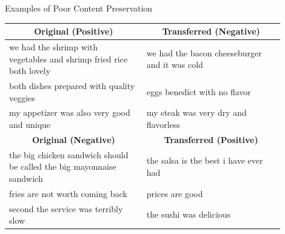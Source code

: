 \documentclass[aspectratio=169]{beamer}
\newcommand{\tabh}[1]{\multicolumn{1}{c|}{\textbf{#1}}}
\newcommand{\tabc}[2]{\multicolumn{1}{|c||}{\multirow{#1}{*}{\textbf{#2}}}}
\begin{document}
% 

\begin{frame}{Examples of Poor Content Preservation}

	\begin{table}[ht]
		\centering
		\begin{tabular}{| p{0.45\linewidth} || p{0.45\linewidth} |}
			\hline
			\tabc{1}{Original (Positive)}                                         & \tabh{Transferred (Negative)}                 \\
			\hline
			\hline
			we had the shrimp with vegetables and shrimp fried rice both lovely   & we had the bacon cheeseburger and it was cold \\
			\hline
			both dishes prepared with quality veggies                             & eggs benedict with no flavor                  \\
			\hline
			my appetizer was also very good and unique                            & my steak was very dry and flavorless          \\
			\hline
			\hline
			\tabc{1}{Original (Negative)}                                         & \tabh{Transferred (Positive)}                 \\
			\hline
			\hline
			the big chicken sandwich should be called the big mayonnaise sandwich & the salsa is the best i have ever had         \\
			\hline
			fries are not worth coming back                                       & prices are good                               \\
			\hline
			second the service was terribly slow                                  & the sushi was delicious                       \\
			\hline
		\end{tabular}
		\label{tab:poor-content-preservation}
	\end{table}
\end{frame}
\end{document}
